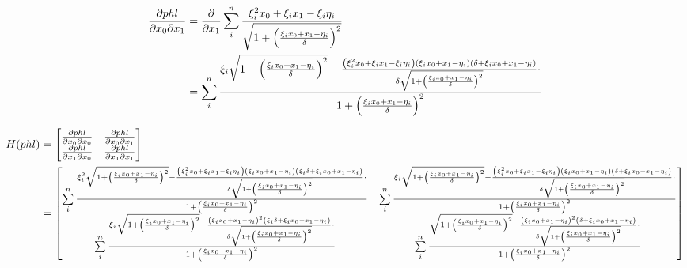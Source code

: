 \documentclass[paper=A3, 
   paper=landscape,]{scrartcl}
\begin{document}
\begin{align*}
\frac{\partial phl}{\partial x_0 \partial x_1} &= \frac{\partial}{\partial x_1} \sum\limits_i^n \frac {\xi_i^2x_0 + \xi_ix_1 - \xi_i \eta_i}{\sqrt{1+ \left( \frac {\xi_i x_0 + x_1 -\eta_i}{\delta}\right)^2 }}\\
& = \sum\limits_i^n \frac {\xi_i  \sqrt{ 1+ \left( \frac {\xi_i x_0 + x_1 -\eta_i} {\delta} \right)^2 } - \frac{\left( \xi_i^2x_0 + \xi_ix_1 - \xi_i \eta_i \right)\left( \xi_i x_0 + x_1 -\eta_i \right) \left( \delta  + \xi_i x_0+x_1-\eta_i \right)}{\delta \sqrt{ 1+ \left( \frac {\xi_i x_0 + x_1 -\eta_i} {\delta} \right) ^2}} \cdot } {1+ \left( \frac {\xi_i x_0 + x_1 -\eta_i} {\delta} \right)^2}\\
\end{align*}


\begin{align}
H(phl) &= \begin{bmatrix}
\frac{\partial phl }{\partial x_0 \partial  x_0} & \frac{\partial phl }{\partial x_0 \partial x_1}\\
\frac{\partial phl }{\partial x_1 \partial  x_0} & \frac{\partial phl }{\partial x_1 \partial x_1}
\end{bmatrix}\\
&=\begin{bmatrix}
\sum\limits_i^n \frac {\xi_i^2 \sqrt{ 1+ \left( \frac {\xi_i x_0 + x_1 -\eta_i} {\delta} \right)^2 } - \frac{\left( \xi_i^2x_0 + \xi_ix_1 - \xi_i \eta_i \right)\left( \xi_i x_0 + x_1 -\eta_i \right) \left(\xi_i \delta  +  \xi_i x_0+x_1-\eta_i \right)}{\delta \sqrt{ 1+ \left( \frac {\xi_i x_0 + x_1 -\eta_i} {\delta} \right) ^2}} \cdot } {1+ \left( \frac {\xi_i x_0 + x_1 -\eta_i} {\delta} \right)^2} & \sum\limits_i^n \frac {\xi_i  \sqrt{ 1+ \left( \frac {\xi_i x_0 + x_1 -\eta_i} {\delta} \right)^2 } - \frac{\left( \xi_i^2x_0 + \xi_ix_1 - \xi_i \eta_i \right)\left( \xi_i x_0 + x_1 -\eta_i \right) \left( \delta  + \xi_i x_0+x_1-\eta_i \right)}{\delta \sqrt{ 1+ \left( \frac {\xi_i x_0 + x_1 -\eta_i} {\delta} \right) ^2}} \cdot } {1+ \left( \frac {\xi_i x_0 + x_1 -\eta_i} {\delta} \right)^2}\\
\sum\limits_i^n \frac {\xi_i \sqrt{ 1+ \left( \frac {\xi_i x_0 + x_1 -\eta_i} {\delta} \right)^2 } - \frac{\left( \xi_i x_0 + x_1 -\eta_i \right)^2 \left(\xi_i \delta  + \xi_i x_0+x_1-\eta_i\right)}{\delta \sqrt{ 1+ \left( \frac {\xi_i x_0 + x_1 -\eta_i} {\delta} \right) ^2}} \cdot } {1+ \left( \frac {\xi_i x_0 + x_1 -\eta_i} {\delta} \right)^2} & \sum\limits_i^n \frac {\sqrt{ 1+ \left( \frac {\xi_i x_0 + x_1 -\eta_i} {\delta} \right)^2 } - \frac{\left( \xi_i x_0 + x_1 -\eta_i \right)^2\left(\delta  + \xi_i x_0+x_1-\eta_i \right)}{\delta \sqrt{ 1+ \left( \frac {\xi_i x_0 + x_1 -\eta_i} {\delta} \right) ^2}} \cdot } {1+ \left( \frac {\xi_i x_0 + x_1 -\eta_i} {\delta} \right)^2}
\end{bmatrix}
\end{align}
\end{document}
